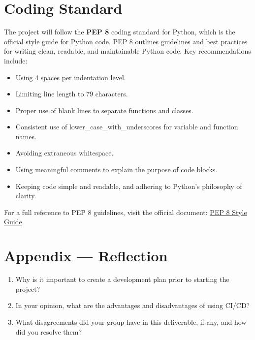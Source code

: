 \documentclass{article}
\begin{document}
\section{Coding Standard}

The project will follow the \textbf{PEP 8} coding standard for Python, which is the official style guide for Python code. PEP 8 outlines guidelines and best practices for writing clean, readable, and maintainable Python code. Key recommendations include:

\begin{itemize}
    \item Using 4 spaces per indentation level.
    \item Limiting line length to 79 characters.
    \item Proper use of blank lines to separate functions and classes.
    \item Consistent use of lower\_case\_with\_underscores for variable and function names.
    \item Avoiding extraneous whitespace.
    \item Using meaningful comments to explain the purpose of code blocks.
    \item Keeping code simple and readable, and adhering to Python’s philosophy of clarity.
    
\end{itemize}

For a full reference to PEP 8 guidelines, visit the official document: \href{https://peps.python.org/pep-0008/}{PEP 8 Style Guide}.


\newpage{}

\section*{Appendix --- Reflection}




\begin{enumerate}
    \item Why is it important to create a development plan prior to starting the
    project?
    \item In your opinion, what are the advantages and disadvantages of using
    CI/CD?
    \item What disagreements did your group have in this deliverable, if any,
    and how did you resolve them?
\end{enumerate}
\end{document}
